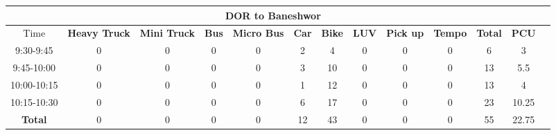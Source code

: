 \begin{landscape}
\begin{table}[h!]
\begin{tabular}{|c|c|c|c|c|c|c|c|c|c|c|c|c|}
    \hline
    \multicolumn{12}{|c|}{\textbf{DOR to Baneshwor}} \\
    \hline
        Time & \textbf{Heavy Truck} & \textbf{Mini Truck} & \textbf{Bus} & \textbf{Micro Bus} & \textbf{Car} & \textbf{Bike} & \textbf{LUV} & \textbf{Pick up} & \textbf{Tempo} & \textbf{\textbf{Total}} & \textbf{PCU} \\
    \hline
    9:30-9:45	&0	&0	&0	&0	&2	&4	&0	&0	&0	&6	&3 \\ \hline
    9:45-10:00	&0	&0	&0	&0	&3	&10	&0	&0	&0	&13	&5.5 \\ \hline
    10:00-10:15	&0	&0	&0	&0	&1	&12	&0	&0	&0	&13	&4 \\ \hline
    10:15-10:30	&0	&0	&0	&0	&6	&17	&0	&0	&0	&23	&10.25 \\ \hline
    \textbf{Total} &0 &0 &0 &0 &12 &43 &0 &0 &0 &55 &22.75 \\
    \hline
\end{tabular}

\end{table}
\end{landscape}


